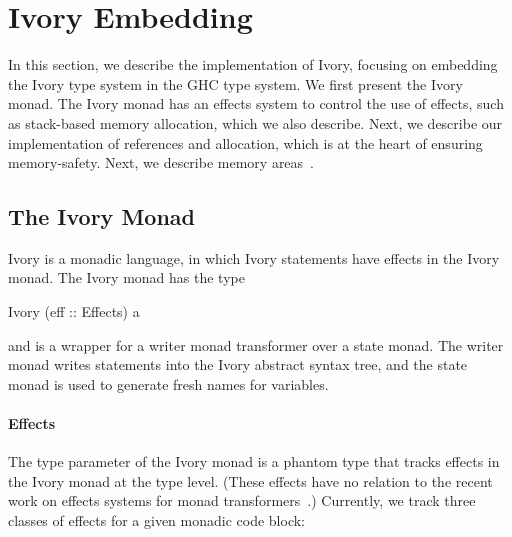 \section{Ivory Embedding}
\label{sec:ivory-embedding}


In this section, we describe the implementation of Ivory, focusing on embedding
the Ivory type system in the GHC type system. We first present the Ivory
monad. The Ivory monad has an effects system to control the use of effects, such
as stack-based memory allocation, which we also describe. Next, we describe our
implementation of references and allocation, which is at the heart of ensuring
memory-safety. Next, we describe memory areas~\cite{}. 

\subsection{The Ivory Monad}
\label{sec:ivory-monad}



Ivory is a monadic language, in which Ivory statements have effects in the Ivory
monad. The Ivory monad has the type

\begin{code}
Ivory (eff :: Effects) a
\end{code}

\noindent
and is a wrapper for a writer monad transformer over a state monad. The writer
monad writes statements into the Ivory abstract syntax tree, and the
state monad is used to generate fresh names for variables.

\paragraph{Effects}
The  type parameter of the Ivory monad is a phantom type that tracks
effects in the Ivory monad at the type level. (These effects have no relation to
the recent work on effects systems for monad transformers~\cite{}.) Currently,
we track three classes of effects for a given monadic code block:

